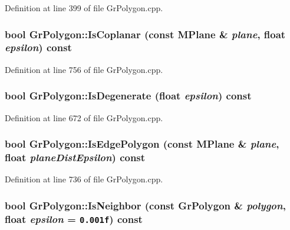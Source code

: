 \begin{CompactItemize}
Definition at line 399 of file GrPolygon.cpp.\hypertarget{class_gr_polygon_f6f970043ece48bc218ff5bc62fa66a5}{
\subsubsection[{IsCoplanar}]{\setlength{\rightskip}{0pt plus 5cm}bool GrPolygon::IsCoplanar (const {\bf MPlane} \& {\em plane}, \/  float {\em epsilon}) const}}
\label{class_gr_polygon_f6f970043ece48bc218ff5bc62fa66a5}




Definition at line 756 of file GrPolygon.cpp.\hypertarget{class_gr_polygon_d87c32f12d3fd9419eb6e7f0a8415a38}{
\subsubsection[{IsDegenerate}]{\setlength{\rightskip}{0pt plus 5cm}bool GrPolygon::IsDegenerate (float {\em epsilon}) const}}
\label{class_gr_polygon_d87c32f12d3fd9419eb6e7f0a8415a38}




Definition at line 672 of file GrPolygon.cpp.\hypertarget{class_gr_polygon_3946b5bfc9871915023821b963455b36}{
\subsubsection[{IsEdgePolygon}]{\setlength{\rightskip}{0pt plus 5cm}bool GrPolygon::IsEdgePolygon (const {\bf MPlane} \& {\em plane}, \/  float {\em planeDistEpsilon}) const}}
\label{class_gr_polygon_3946b5bfc9871915023821b963455b36}




Definition at line 736 of file GrPolygon.cpp.\hypertarget{class_gr_polygon_7cdc587de8a706861b8ebecb3078e0d0}{
\subsubsection[{IsNeighbor}]{\setlength{\rightskip}{0pt plus 5cm}bool GrPolygon::IsNeighbor (const {\bf GrPolygon} \& {\em polygon}, \/  float {\em epsilon} = {\tt 0.001f}) const}}
\label{class_gr_polygon_7cdc587de8a706861b8ebecb3078e0d0}





\end{CompactItemize}
